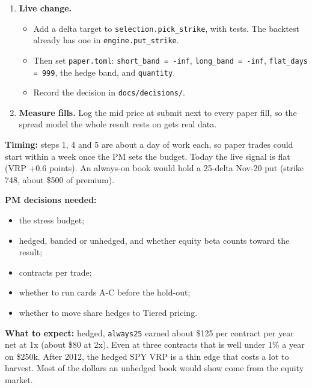 \documentclass{article}
\begin{document}
\begin{enumerate}
\item \textbf{Live change.}

\begin{itemize}

\item Add a delta target to \texttt{selection.\allowbreak{}pick\_\allowbreak{}strike}, with tests. The backtest already has one in \texttt{engine.\allowbreak{}put\_\allowbreak{}strike}.

\item Then set \texttt{paper.\allowbreak{}toml}: \texttt{short\_\allowbreak{}band = -\allowbreak{}inf}, \texttt{long\_\allowbreak{}band = -\allowbreak{}inf}, \texttt{flat\_\allowbreak{}days = 999}, the hedge band, and \texttt{quantity}.

\item Record the decision in \texttt{docs/\allowbreak{}decisions/\allowbreak{}}.

\end{itemize}

\item \textbf{Measure fills.} Log the mid price at submit next to every paper fill, so the spread model the whole result rests on gets real data.

\end{enumerate}

\textbf{Timing:} steps 1, 4 and 5 are about a day of work each, so paper trades could start within a week once the PM sets the budget. Today the live signal is flat (VRP +0.6 points). An always-on book would hold a 25-delta Nov-20 put (strike 748, about \$500 of premium).

\textbf{PM decisions needed:}

\begin{itemize}

\item the stress budget;

\item hedged, banded or unhedged, and whether equity beta counts toward the result;

\item contracts per trade;

\item whether to run cards A-C before the hold-out;

\item whether to move share hedges to Tiered pricing.

\end{itemize}

\textbf{What to expect:} hedged, \texttt{always25} earned about \$125 per contract per year net at 1x (about \$80 at 2x). Even at three contracts that is well under 1\% a year on \$250k. After 2012, the hedged SPY VRP is a thin edge that costs a lot to harvest. Most of the dollars an unhedged book would show come from the equity market.
\end{document}
